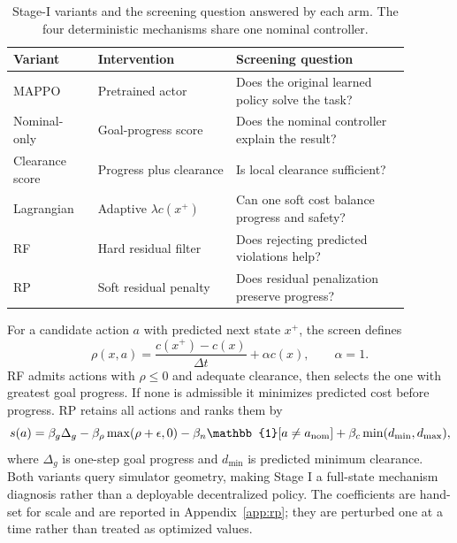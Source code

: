 \documentclass{article}
\begin{document}
\begin{table}[t]
\caption{Stage-I variants and the screening question answered by each arm. The four deterministic mechanisms share one nominal controller.}
\label{tab:controllers}
\centering
\small
\begin{tabular}{L{0.19\linewidth}L{0.31\linewidth}L{0.39\linewidth}}
\toprule
Variant & Intervention & Screening question \\
\midrule
MAPPO & Pretrained actor & Does the original learned policy solve the task? \\
Nominal-only & Goal-progress score & Does the nominal controller explain the result? \\
Clearance score & Progress plus clearance & Is local clearance sufficient? \\
Lagrangian & Adaptive $\lambda c(x^+)$ & Can one soft cost balance progress and safety? \\
RF & Hard residual filter & Does rejecting predicted violations help? \\
RP & Soft residual penalty & Does residual penalization preserve progress? \\
\bottomrule
\end{tabular}
\end{table}

For a candidate action $a$ with predicted next state $x^+$, the screen defines
\begin{equation}
\rho(x,a)=\frac{c(x^+)-c(x)}{\Delta t}+\alpha c(x),\qquad \alpha=1.
\label{eq:residual}
\end{equation}
RF admits actions with $\rho\leq0$ and adequate clearance, then selects the one with greatest goal progress. If none is admissible it minimizes predicted cost before progress. RP retains all actions and ranks them by
\begin{equation}
s(a)=\beta_g\Delta_g-\beta_\rho\max(\rho+\epsilon,0)-\beta_n\mathbb{1}[a\neq a_{\rm nom}]+\beta_c\min(d_{\min},d_{\max}),
\label{eq:rp_score}
\end{equation}
where $\Delta_g$ is one-step goal progress and $d_{\min}$ is predicted minimum clearance. Both variants query simulator geometry, making Stage I a full-state mechanism diagnosis rather than a deployable decentralized policy. The coefficients are hand-set for scale and are reported in Appendix~\ref{app:rp}; they are perturbed one at a time rather than treated as optimized values.
\end{document}
